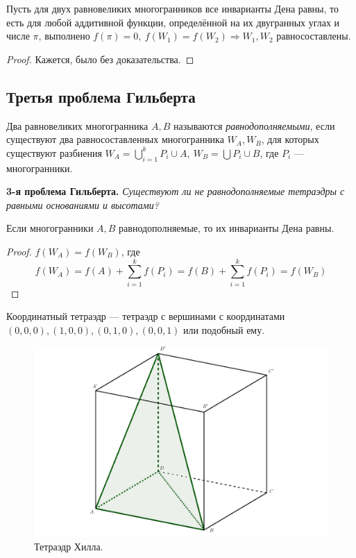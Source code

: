 \begin{theorem}[Сидлер]
    Пусть для двух равновеликих многогранников все инварианты Дена равны, то есть для любой аддитивной функции, определённой на их двугранных углах и числе $\pi$, выполнено $f(\pi) = 0, \ f(W_1) = f(W_2) \Rightarrow W_1, W_2$ равносоставлены.
\end{theorem}
\begin{proof}
    Кажется, было без доказательства.
\end{proof} 

\subsection{Третья проблема Гильберта}
\begin{definition}
    Два равновеликих многогранника $A, B$ называются \textit{равнодополняемыми}, если существуют два равносоставленных многогранника $W_A, W_B$, для которых существуют разбиения $W_A = \bigcup_{i = 1}^k P_i \cup A, \ W_B = \bigcup P_i \cup B$, где $P_i$ — многогранники.
\end{definition}

\noindent \textbf{3-я проблема Гильберта.}
\textit{Существуют ли не равнодополняемые тетраэдры с равными основаниями и высотами?}

\begin{statement}
    Если многогранники $A,B$ равнодополняемые, то их инварианты Дена равны.
\end{statement}
\begin{proof}
    $f(W_A) = f(W_B)$, где $$f(W_A) = f(A) + \sum_{i = 1}^{k} f(P_i) = f(B) + \sum_{i = 1}^{k} f(P_i) = f(W_B)$$
\end{proof}

\begin{definition}
    Координатный тетраэдр — тетраэдр с вершинами с координатами $(0,0,0), (1,0,0), (0,1,0), (0,0,1)$ или подобный ему.
\end{definition} 

\begin{figure}[htbp]
    \centering
    \includegraphics[scale=0.2]{images/c9.7.png}
    \caption{Тетраэдр Хилла.}
    \label{fig:c9.7}
\end{figure}

